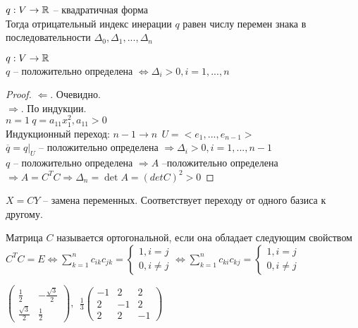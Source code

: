 \begin{Cons}
	$q: V \to \mathbb{R}$ -- квадратичная форма\\
	Тогда отрицательный индекс инерации $q$ равен числу перемен знака в последовательности $\Delta_0, \Delta_1, ..., \Delta_n$ 
\end{Cons}

\begin{Thm} 
	$q: V \to \mathbb{R}$\\
	$q$ -- положительно  определена $\Leftrightarrow \Delta_i > 0, i = 1,...,n$
\end{Thm} 

\begin{proof}
	$\Leftarrow.$ Очевидно.\\
	$\Rightarrow$. По индукции.\\
	$n=1 \ q = a_{11}x^2_1, a_{11} > 0$\\
	Индукционный переход: $n-1 \to n \ \ U = <e_1, ..., e_{n-1}>$\\
	$\overline{q} = q \big|_U$ -- положительно определена $\Rightarrow \Delta_i > 0, i = 1, ..., n-1$\\
	$q$ -- положительно определена $\Rightarrow A$ --положительно определена $\Rightarrow A = C^TC \Rightarrow \Delta_n = \det A = (det C)^2 > 0$ 
\end{proof}

\begin{Def} 
	$X = CY$ -- замена переменных. Соответствует переходу от одного базиса к другому. 
\end{Def} 

\begin{Def} 
	Матрица $C$ называется ортогональной, если она обладает следующим свойством $C^TC=E \Leftrightarrow \sum_{k=1}^{n} c_{ik} c_{jk} = \begin{cases}
		1, i = j\\
		0, i \neq j
	\end{cases} \Leftrightarrow \sum_{k=1}^{n} c_{ki}c_{kj} = \begin{cases}
		1, i = j\\
		0, i \neq j
	\end{cases}$
\end{Def} 

\begin{Example}
	$\left(\begin{array}{cc}
		\frac{1}{2} & -\frac{\sqrt{3}}{2}\\
		\frac{\sqrt{3}}{2} & \frac{1}{2}
	\end{array} \right), \ \
	\frac{1}{3} \left(
	\begin{array}{ccc}
		-1 & 2 & 2\\
		2 & -1 & 2\\ 
		2 & 2 & -1
	\end{array} \right)$
\end{Example}

